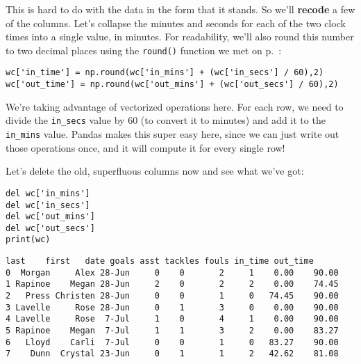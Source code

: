 
This is hard to do with the data in the form that it stands. So we'll
\textbf{recode} a few of the columns. Let's collapse the minutes and seconds
for each of the two clock times into a single value, in minutes. For
readability, we'll also round this number to two decimal places using the
\texttt{round()} function we met on p.~\pageref{round}:

\begin{Verbatim}[fontsize=\small,samepage=true,frame=single,framesep=3mm]
wc['in_time'] = np.round(wc['in_mins'] + (wc['in_secs'] / 60),2)
wc['out_time'] = np.round(wc['out_mins'] + (wc['out_secs'] / 60),2)
\end{Verbatim}


We're taking advantage of vectorized operations here. For each row, we need to
divide the \texttt{in\_secs} value by 60 (to convert it to minutes) and add it
to the \texttt{in\_mins} value. Pandas makes this super easy here, since we can
just write out those operations once, and it will compute it for every single
row!

\medskip
Let's delete the old, superfluous columns now and see what we've got:

\begin{samepage}
\begin{Verbatim}[fontsize=\small,samepage=true,frame=single,framesep=3mm]
del wc['in_mins']
del wc['in_secs']
del wc['out_mins']
del wc['out_secs']
print(wc)
\end{Verbatim}
\vspace{-.2in}

\begin{Verbatim}[fontsize=\footnotesize,samepage=true,frame=leftline,framesep=5mm,framerule=1mm]
     last    first   date goals asst tackles fouls in_time out_time
0  Morgan     Alex 28-Jun     0    0       2     1    0.00    90.00
1 Rapinoe    Megan 28-Jun     2    0       2     2    0.00    74.45
2   Press Christen 28-Jun     0    0       1     0   74.45    90.00
3 Lavelle     Rose 28-Jun     0    1       3     0    0.00    90.00
4 Lavelle     Rose  7-Jul     1    0       4     1    0.00    90.00
5 Rapinoe    Megan  7-Jul     1    1       3     2    0.00    83.27
6   Lloyd    Carli  7-Jul     0    0       1     0   83.27    90.00
7    Dunn  Crystal 23-Jun     0    1       1     2   42.62    81.08
\end{Verbatim}
\end{samepage}

